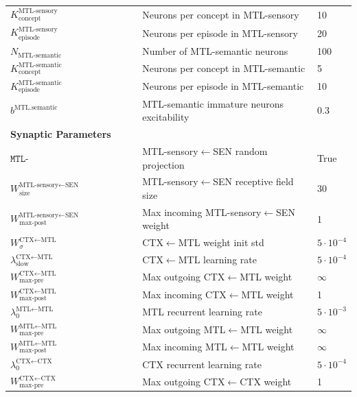 \documentclass{article}
\begin{document}
\begin{table}[ht]
\begin{tabular}{lp{6cm}l}
$K^\textrm{MTL-sensory}_\textrm{concept}$ & Neurons per concept in MTL-sensory & 10 \\
$K^\textrm{MTL-sensory}_\textrm{episode}$ & Neurons per episode in MTL-sensory & 20 \\
$N_{\text{MTL-semantic}}$ & Number of MTL-semantic neurons & 100 \\
$K^\textrm{MTL-semantic}_\textrm{concept}$ & Neurons per concept in MTL-semantic & 5 \\
$K^\textrm{MTL-semantic}_\textrm{episode}$ & Neurons per episode in MTL-semantic & 10 \\
$b^\text{MTL.semantic}$ & MTL-semantic immature neurons excitability & 0.3 \\
\midrule
\multicolumn{3}{l}{\textbf{Synaptic Parameters}} \\
\midrule
$\texttt{MTL-sensory\_SEN\_projection}$ & MTL-sensory$\leftarrow$SEN random projection & True \\
$W^{\textrm{MTL-sensory}\leftarrow\textrm{SEN}}_\textrm{size}$ & MTL-sensory$\leftarrow$SEN receptive field size & 30 \\
$W^{\text{MTL-sensory}\leftarrow\text{SEN}}_{\text{max-post}}$ & Max incoming MTL-sensory$\leftarrow$SEN weight & 1 \\
$W_\sigma^{\text{CTX}\leftarrow\text{MTL}}$ & CTX$\leftarrow$MTL weight init std &$5\cdot 10^{-4}$ \\
$\lambda^{\text{CTX}\leftarrow\text{MTL}}_{\textrm{slow}}$ & CTX$\leftarrow$MTL learning rate & $5\cdot 10^{-4}$ \\
$W^{\text{CTX}\leftarrow\text{MTL}}_{\text{max-pre}}$ & Max outgoing CTX$\leftarrow$MTL weight & $\infty$ \\
$W^{\text{CTX}\leftarrow\text{MTL}}_{\text{max-post}}$ & Max incoming CTX$\leftarrow$MTL weight & 1 \\
$\lambda^{\text{MTL}\leftarrow\text{MTL}}_0$ & MTL recurrent learning rate & $5\cdot 10^{-3}$ \\
$W^{\text{MTL}\leftarrow\text{MTL}}_{\text{max-pre}}$ & Max outgoing MTL$\leftarrow$MTL weight & $\infty$ \\
$W^{\text{MTL}\leftarrow\text{MTL}}_{\text{max-post}}$ & Max incoming MTL$\leftarrow$MTL weight & $\infty$ \\
$\lambda^{\text{CTX}\leftarrow\text{CTX}}_0$ & CTX recurrent learning rate & $5\cdot 10^{-4}$ \\
$W^{\text{CTX}\leftarrow\text{CTX}}_{\text{max-pre}}$ & Max outgoing CTX$\leftarrow$CTX weight & 1 \\

\end{tabular}
\end{table}
\end{document}
